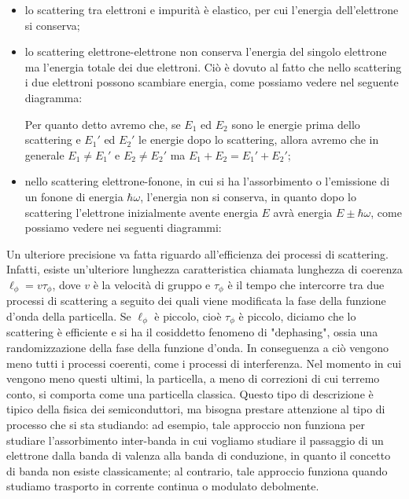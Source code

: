 \begin{itemize}[leftmargin=0.5cm]
    \item lo scattering tra elettroni e impurità è elastico, per cui l'energia dell'elettrone si conserva;
    \item lo scattering elettrone-elettrone non conserva l'energia del singolo elettrone ma l'energia totale dei due elettroni. Ciò è dovuto al fatto che nello scattering i due elettroni possono scambiare energia, come possiamo vedere nel seguente diagramma:
    \begin{figure}[H]
        \centering
    \end{figure}
    Per quanto detto avremo che, se $E_1$ ed $E_2$ sono le energie prima dello scattering e $E_1'$ ed $E_2'$ le energie dopo lo scattering, allora avremo che in generale $E_1 \neq E_1'$ e $E_2 \neq E_2'$ ma $E_1 + E_2 = E_1' + E_2'$;
    \item nello scattering elettrone-fonone, in cui si ha l'assorbimento o l'emissione di un fonone di energia $\hbar \omega$, l'energia non si conserva, in quanto dopo lo scattering l'elettrone inizialmente avente energia $E$ avrà energia $E \pm \hbar \omega$, come possiamo vedere nei seguenti diagrammi:
    \begin{figure}[H]
        \centering
    \end{figure}
\end{itemize}
Un ulteriore precisione va fatta riguardo all'efficienza dei processi di scattering. Infatti, esiste un'ulteriore lunghezza caratteristica chiamata lunghezza di coerenza $\ell_\phi=v\tau_\phi$, dove $v$ è la velocità di gruppo e $\tau_\phi$ è il tempo che intercorre tra due processi di scattering a seguito dei quali viene modificata la fase della funzione d'onda della particella. Se $\ell_\phi$ è piccolo, cioè $\tau_\phi$ è piccolo, diciamo che lo scattering è efficiente e si ha il cosiddetto fenomeno di "dephasing", ossia una randomizzazione della fase della funzione d'onda. In conseguenza a ciò vengono meno tutti i processi coerenti, come i processi di interferenza. Nel momento in cui vengono meno questi ultimi, la particella, a meno di correzioni di cui terremo conto, si comporta come una particella classica. Questo tipo di descrizione è tipico della fisica dei semiconduttori, ma bisogna prestare attenzione al tipo di processo che si sta studiando: ad esempio, tale approccio non funziona per studiare l'assorbimento inter-banda in cui vogliamo studiare il passaggio di un elettrone dalla banda di valenza alla banda di conduzione, in quanto il concetto di banda non esiste classicamente; al contrario, tale approccio funziona quando studiamo trasporto in corrente continua o modulato debolmente.\\
